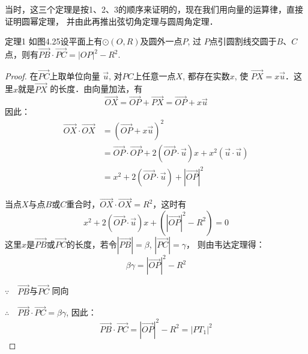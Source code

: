 当时，这三个定理是按1、2、3的顺序来证明的，现在我们用向量的运算律，直接证明圆幂定理，
并由此再推出弦切角定理与圆周角定理．

\begin{blk}{定理1}
    如图4.25设平面上有$\odot (O,R)$及圆外一点$P$, 过
$P$点引圆割线交圆于$B$、$C$点，则有$\Vec{PB}\cdot \Vec{PC}=|OP|^2-R^2$.
\end{blk}

\begin{figure}[htp]
    \centering
{}   
    \caption{}
\end{figure}


\begin{proof}
    在$\Vec{PC}$上取单位向量
$\vec{u}$, 对$PC$上任意一点$X$, 都存在实数$x$, 使
$\Vec{PX}=x\vec{u}$．这里$x$就是$\Vec{PX}$
的长度．由向量加法，有
\[\Vec{OX}=\Vec{OP}+\Vec{PX}=\Vec{OP}+x\vec{u}\]
因此：
\[\begin{split}
    \Vec{OX}\cdot \Vec{OX}&=\left(\Vec{OP}+x\vec{u}\right)^2\\
    &=\Vec{OP}\cdot \Vec{OP}+2\left(\Vec{OP}\cdot \vec{u}\right)x+x^2(\vec{u}\cdot \vec{u})\\
    &=x^2+2\left(\Vec{OP}\cdot \vec{u}\right)+|\Vec{OP}|^2
\end{split}\]

当点$X$与点$B$或$C$重合时，$\Vec{OX}\cdot \Vec{OX}=R^2$，这时有
\[x^2+2\left(\Vec{OP}\cdot \vec{u}\right)x+\left(|\Vec{OP}|^2-R^2\right)=0\]
这里$x$是$\Vec{PB}$或$\Vec{PC}$的长度，若令$|\Vec{PB}|=\beta$,
 $|\Vec{PC}|=\gamma$，
则由韦达定理得：
\[\beta\gamma=|\Vec{OP}|^2-R^2\]

$\because\quad \Vec{PB}$与$\Vec{PC}$
同向

$\therefore\quad \Vec{PB}\cdot \Vec{PC}=\beta\gamma$, 因此：
\[\Vec{PB}\cdot \Vec{PC}=|\Vec{OP}|^2-R^2=|PT_1|^2\]
\end{proof}

